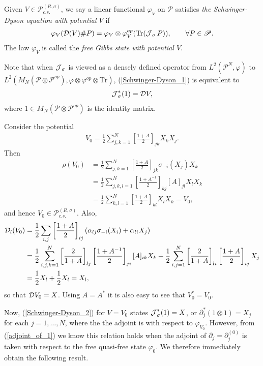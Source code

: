 \begin{defi}
Given $V\in\mathscr{P}^{(R,\sigma)}_{c.s.}$, we say a linear functional $\varphi_V$ on $\mathscr{P}$ satisfies \textit{the Schwinger-Dyson equation with potential $V$} if
	\begin{align}\label{Schwinger-Dyson_1}
		\varphi_V( \mathcal D(V) \# P) = \varphi_V\otimes\varphi_V^{op}(\text{Tr}(\operatorname{\mathcal J}_\sigma P)),\qquad\forall P\in\mathscr{P}.
	\end{align}
The law $\varphi_V$ is called the \textit{free Gibbs state with potential $V$}.
\end{defi}

Note that when $\operatorname{\mathcal J}_\sigma$ is viewed as a densely defined operator from $L^2(\mathscr{P}^N,\varphi)$ to $L^2(M_N(\mathscr{P}\otimes\mathscr{P}^{op}),\varphi\otimes\varphi^{op}\otimes\text{Tr})$, (\ref{Schwinger-Dyson_1}) is equivalent to
	\begin{align}\label{Schwinger-Dyson_2}
		\operatorname{\mathcal J}_\sigma^*(1)=\mathcal D V,
	\end{align}
where $1\in M_N(\mathscr{P}\otimes\mathscr{P}^{op})$ is the identity matrix.\par
Consider the potential
	\begin{align}\label{quadratic_potential}
		V_0=\frac{1}{2}\sum_{j,k=1}^N \left[\frac{1+A}{2}\right]_{jk} X_k X_j.
	\end{align}
Then
	\begin{align*}
		\rho(V_0)&=\frac{1}{2}\sum_{j,k=1}^N  \left[\frac{1+A}{2}\right]_{jk} \sigma_{-i}(X_j)X_k\\
			&=\frac{1}{2}\sum_{j,k,l=1}^N  \left[\frac{1+A^{-1}}{2}\right]_{kj}[A]_{jl} X_l X_k\\
			& = \frac{1}{2} \sum_{k,l=1}^N  \left[\frac{1+A}{2}\right]_{kl} X_l X_k= V_0,
	\end{align*}
and hence $V_0\in\mathscr{P}_{c.s.}^{(R,\sigma)}$. Also,
	\begin{align*}
		\mathcal D_l(V_0)&=\frac{1}{2}\sum_{i,j}  \left[\frac{1+A}{2}\right]_{ij} \left(\alpha_{lj} \sigma_{-i}(X_i) + \alpha_{li} X_j\right)\\
			&= \frac{1}{2} \sum_{i,j,k=1}^N  \left[\frac{2}{1+A}\right]_{lj}\left[\frac{1+A^{-1}}{2}\right]_{ji}[A]_{ik} X_k + \frac{1}{2}\sum_{i,j=1}^N  \left[\frac{2}{1+A}\right]_{li} \left[\frac{1+A}{2}\right]_{ij} X_j \\
			&=\frac{1}{2}X_l+\frac{1}{2}X_l=X_l,
	\end{align*}
so that $\mathcal D V_0=X$. Using $A=A^*$ it is also easy to see that $V_0^*=V_0$.\par
Now, (\ref{Schwinger-Dyson_2}) for $V=V_0$ states $\operatorname{\mathcal J}_\sigma^*(1)=X$, or $\partial_j^*(1\otimes 1)=X_j$ for each $j=1,\ldots, N$, where the the adjoint is with respect to $\varphi_{V_0}$. However, from (\ref{adjoint_of_1}) we know this relation holds when the adjoint of $\partial_j=\partial_j^{(0)}$ is taken with respect to the free quasi-free state $\varphi_0$. We therefore immediately obtain the following result.

